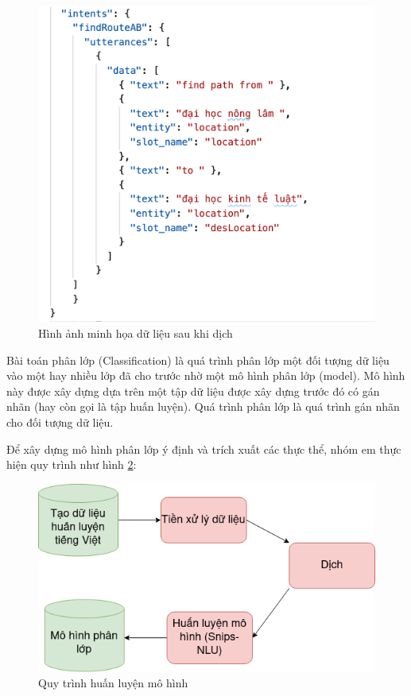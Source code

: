 \begin{figure}[H]
    \centering
    \includegraphics[width=15cm]{images/Data-train-ex.png}
    \caption{Hình ảnh minh họa dữ liệu sau khi dịch}
    \label{fig:data-train-en} 
\end{figure}


Bài toán phân lớp (Classification) là quá trình phân lớp một đối tượng dữ liệu vào một hay nhiều lớp đã cho trước nhờ một mô hình phân lớp (model). Mô hình này được xây dựng dựa trên một tập dữ liệu được xây dựng trước đó có gán nhãn (hay còn gọi là tập huấn luyện). Quá trình phân lớp là quá trình gán nhãn cho đối tượng dữ liệu.



Để xây dựng mô hình phân lớp ý định và trích xuất các thực thể, nhóm em thực hiện quy trình như hình \ref{fig:FlowTrainingData}:

\begin{figure}[H]
    \centering
    \includegraphics[width=15cm]{images/FlowTrainingData.png}
    \caption{Quy trình huấn luyện mô hình}
    \label{fig:FlowTrainingData}
\end{figure}

